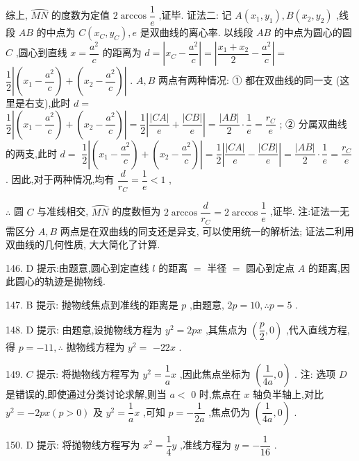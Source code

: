 综上, $\overset{⏜}{MN}$ 的度数为定值 $2\arccos \dfrac{1}{e}$ ,证毕. 证法二: 记 $A\left( {{x}_{1},{y}_{1}}\right) ,B\left( {{x}_{2},{y}_{2}}\right)$ ,线段 ${AB}$ 的中点为 $C\left( {{x}_{C},{y}_{C}}\right) ,e$ 是双曲线的离心率. 以线段 ${AB}$ 的中点为圆心的圆 $C$ ,圆心到直线 $x = \dfrac{{a}^{2}}{c}$ 的距离为 $d = \left| {{x}_{C} - \dfrac{{a}^{2}}{c}}\right|  = \left| {\dfrac{{x}_{1} + {x}_{2}}{2} - \dfrac{{a}^{2}}{c}}\right|  =$  $\dfrac{1}{2}\left| {\left( {{x}_{1} - \dfrac{{a}^{2}}{c}}\right)  + \left( {{x}_{2} - \dfrac{{a}^{2}}{c}}\right) }\right|$ . $A,B$ 两点有两种情况: ① 都在双曲线的同一支 (这里是右支),此时 $d =$  $\dfrac{1}{2}\left| {\left( {{x}_{1} - \dfrac{{a}^{2}}{c}}\right)  + \left( {{x}_{2} - \dfrac{{a}^{2}}{c}}\right) }\right|  = \dfrac{1}{2}\left| {\dfrac{\left| CA\right| }{e} + \dfrac{\left| CB\right| }{e}}\right|  = \dfrac{\left| AB\right| }{2} \cdot  \dfrac{1}{e} = \dfrac{{r}_{C}}{e}$ ; ② 分属双曲线的两支,此时 $d =$  $\dfrac{1}{2}\left| {\left( {{x}_{1} - \dfrac{{a}^{2}}{c}}\right)  + \left( {{x}_{2} - \dfrac{{a}^{2}}{c}}\right) }\right|  = \dfrac{1}{2}\left| {\dfrac{\left| CA\right| }{e} - \dfrac{\left| CB\right| }{e}}\right|  = \dfrac{\left| AB\right| }{2} \cdot  \dfrac{1}{e} = \dfrac{{r}_{C}}{e}$ . 因此,对于两种情况,均有 $\dfrac{d}{{r}_{C}} = \dfrac{1}{e} < 1$ ,

$\therefore$ 圆 $C$ 与准线相交, $\overset{⏜}{MN}$ 的度数恒为 $2\arccos \dfrac{d}{{r}_{C}} = 2\arccos \dfrac{1}{e}$ ,证毕. 注:证法一无需区分 $A,B$ 两点是在双曲线的同支还是异支, 可以使用统一的解析法; 证法二利用双曲线的几何性质, 大大简化了计算.

146. D 提示:由题意,圆心到定直线 $l$ 的距离 $=$ 半径 $=$ 圆心到定点 $A$ 的距离,因此圆心的轨迹是抛物线.

147. B 提示: 抛物线焦点到准线的距离是 $p$ ,由题意, ${2p} = {10},\therefore p = 5$ .

148. D 提示: 由题意,设抛物线方程为 ${y}^{2} = {2px}$ ,其焦点为 $\left( {\dfrac{p}{2},0}\right)$ ,代入直线方程,得 $p =  - {11},\therefore$ 抛物线方程为 ${y}^{2} =$  $- {22x}$ .

149. $C$ 提示: 将抛物线方程写为 ${y}^{2} = \dfrac{1}{a}x$ ,因此焦点坐标为 $\left( {\dfrac{1}{4a},0}\right)$ . 注: 选项 $D$ 是错误的,即使通过分类讨论求解,则当 $a <$ 0 时,焦点在 $x$ 轴负半轴上,对比 ${y}^{2} =  - {2px}\left( {p > 0}\right)$ 及 ${y}^{2} = \dfrac{1}{a}x$ ,可知 $p =  - \dfrac{1}{2a}$ ,焦点仍为 $\left( {\dfrac{1}{4a},0}\right)$ .

150. D 提示: 将抛物线方程写为 ${x}^{2} = \dfrac{1}{4}y$ ,准线方程为 $y =  - \dfrac{1}{16}$ .

